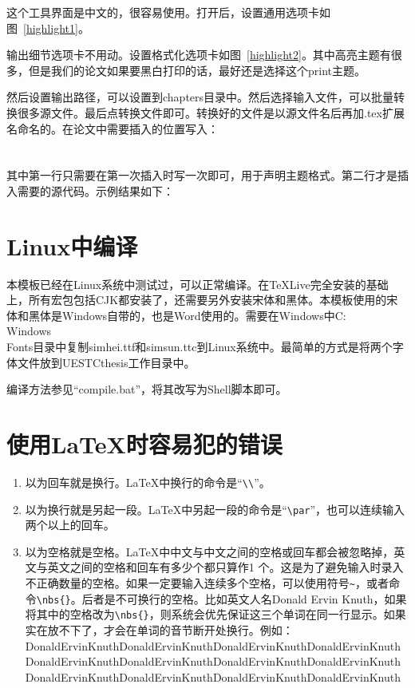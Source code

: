 这个工具界面是中文的，很容易使用。打开后，设置通用选项卡如图~\ref{highlight1}。

输出细节选项卡不用动。设置格式化选项卡如图~\ref{highlight2}。其中高亮主题有很多，但是我们的论文如果要黑白打印的话，最好还是选择这个print主题。

然后设置输出路径，可以设置到chapters目录中。然后选择输入文件，可以批量转换很多源文件。最后点转换文件即可。转换好的文件是以源文件名后再加.tex扩展名命名的。在论文中需要插入的位置写入：\\
\verb||\\
\verb||\\
其中第一行只需要在第一次插入时写一次即可，用于声明主题格式。第二行才是插入需要的源代码。示例结果如下：


\section{Linux中编译}
本模板已经在Linux系统中测试过，可以正常编译。在TeXLive完全安装的基础上，所有宏包包括CJK都安装了，还需要另外安装宋体和黑体。本模板使用的宋体和黑体是Windows自带的，也是Word使用的。需要在Windows中C:\\Windows\\Fonts目录中复制simhei.ttf和simsun.ttc到Linux系统中。最简单的方式是将两个字体文件放到UESTCthesis工作目录中。

编译方法参见“compile.bat”，将其改写为Shell脚本即可。
\section{使用\LaTeX{}时容易犯的错误}
\begin{enumerate}
\item 以为回车就是换行。\LaTeX{}中换行的命令是“\verb|\\|”。
\item 以为换行就是另起一段。\LaTeX{}中另起一段的命令是“\verb|\par|”，也可以连续输入两个以上的回车。
\item 以为空格就是空格。\LaTeX{}中中文与中文之间的空格或回车都会被忽略掉，英文与英文之间的空格和回车有多少个都只算作1 个。这是为了避免输入时录入不正确数量的空格。如果一定要输入连续多个空格，可以使用符号\verb|~|，或者命令\verb|\nbs{}|。后者是不可换行的空格。比如英文人名Donald Ervin Knuth，如果将其中的空格改为\verb|\nbs{}|，则系统会优先保证这三个单词在同一行显示。如果实在放不下了，才会在单词的音节断开处换行。例如：
    Donald\nbs{}Ervin\nbs{}Knuth\nbs{}Donald\nbs{}Ervin\nbs{}Knuth\nbs{}Donald\nbs{}Ervin\nbs{}Knuth\nbs{}Donald\nbs{}Ervin\nbs{}Knuth\nbs{}Donald\nbs{}Ervin\nbs{}Knuth\nbs{}Donald\nbs{}Ervin\nbs{}Knuth\nbs{}Donald\nbs{}Ervin\nbs{}Knuth\nbs{}Donald\nbs{}Ervin\nbs{}Knuth\nbs{}Donald\nbs{}Ervin\nbs{}Knuth\nbs{}Donald\nbs{}Ervin\nbs{}Knuth\nbs{}Donald\nbs{}Ervin\nbs{}Knuth\nbs{}Donald\nbs{}Ervin\nbs{}Knuth\nbs{}
\end{enumerate}

